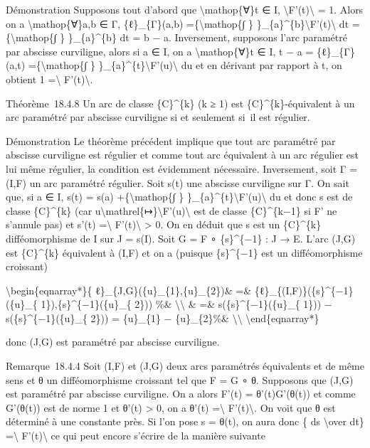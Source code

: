 \documentclass[]{article}
\begin{document}
Démonstration Supposons tout d'abord que \textbackslash{}mathop\{∀\}t ∈
I, \textbackslash{}\textbar{}F'(t)\textbackslash{}\textbar{} = 1. Alors
on a \textbackslash{}mathop\{∀\}a,b ∈ Γ, \{ℓ\}\_\{Γ\}(a,b)
=\{\textbackslash{}mathop\{∫ \}
\}\_\{a\}\^{}\{b\}\textbackslash{}\textbar{}F'(t)\textbackslash{}\textbar{}
dt =\{\textbackslash{}mathop\{∫ \} \}\_\{a\}\^{}\{b\} dt = b − a.
Inversement, supposons l'arc paramétré par abscisse curviligne, alors si
a ∈ I, on a \textbackslash{}mathop\{∀\}t ∈ I, t − a = \{ℓ\}\_\{Γ\}(a,t)
=\{\textbackslash{}mathop\{∫ \}
\}\_\{a\}\^{}\{t\}\textbackslash{}\textbar{}F'(u)\textbackslash{}\textbar{}
du et en dérivant par rapport à t, on obtient 1
=\textbackslash{}\textbar{} F'(t)\textbackslash{}\textbar{}.

Théorème~18.4.8 Un arc de classe \{C\}\^{}\{k\} (k ≥ 1) est
\{C\}\^{}\{k\}-équivalent à un arc paramétré par abscisse curviligne si
et seulement si~il est régulier.

Démonstration Le théorème précédent implique que tout arc paramétré par
abscisse curviligne est régulier et comme tout arc équivalent à un arc
régulier est lui même régulier, la condition est évidemment nécessaire.
Inversement, soit Γ = (I,F) un arc paramétré régulier. Soit s(t) une
abscisse curviligne sur Γ. On sait que, si a ∈ I, s(t) = s(a)
+\{\textbackslash{}mathop\{∫ \}
\}\_\{a\}\^{}\{t\}\textbackslash{}\textbar{}F'(u)\textbackslash{}\textbar{}
du et donc s est de classe \{C\}\^{}\{k\} (car
u\textbackslash{}mathrel\{↦\}\textbackslash{}\textbar{}F'(u)\textbackslash{}\textbar{}
est de classe \{C\}\^{}\{k−1\} si F' ne s'annule pas) et s'(t)
=\textbackslash{}\textbar{} F'(t)\textbackslash{}\textbar{}
\textgreater{} 0. On en déduit que s est un \{C\}\^{}\{k\}
difféomorphisme de I sur J = s(I). Soit G = F ∘ \{s\}\^{}\{−1\} : J → E.
L'arc (J,G) est \{C\}\^{}\{k\} équivalent à (I,F) et on a (puisque
\{s\}\^{}\{−1\} est un difféomorphisme croissant)

\textbackslash{}begin\{eqnarray*\}\{
ℓ\}\_\{J,G\}(\{u\}\_\{1\},\{u\}\_\{2\})\& =\&
\{ℓ\}\_\{(I,F)\}(\{s\}\^{}\{−1\}(\{u\}\_\{
1\}),\{s\}\^{}\{−1\}(\{u\}\_\{ 2\})) \%\&
\textbackslash{}\textbackslash{} \& =\& s(\{s\}\^{}\{−1\}(\{u\}\_\{
1\})) − s(\{s\}\^{}\{−1\}(\{u\}\_\{ 2\})) = \{u\}\_\{1\} −
\{u\}\_\{2\}\%\& \textbackslash{}\textbackslash{}
\textbackslash{}end\{eqnarray*\}

donc (J,G) est paramétré par abscisse curviligne.

Remarque~18.4.4 Soit (I,F) et (J,G) deux arcs paramétrés équivalents et
de même sens et θ un difféomorphisme croissant tel que F = G ∘ θ.
Supposons que (J,G) est paramétré par abscisse curviligne. On a alors
F'(t) = θ'(t)G'(θ(t)) et comme G'(θ(t)) est de norme 1 et θ'(t)
\textgreater{} 0, on a θ'(t) =\textbackslash{}\textbar{}
F'(t)\textbackslash{}\textbar{}. On voit que θ est déterminé à une
constante près. Si l'on pose s = θ(t), on aura donc \{ ds
\textbackslash{}over dt\} =\textbackslash{}\textbar{}
F'(t)\textbackslash{}\textbar{} ce qui peut encore s'écrire de la
manière suivante
\end{document}
